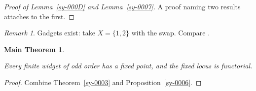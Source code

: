 \documentclass{amsart}
\providecommand{\uses}[1]{}
\theoremstyle{plain}
\newtheorem*{mainthm}{Main Theorem}
\theoremstyle{definition}
\theoremstyle{remark}
\newtheorem{remark}[theorem]{Remark}
\begin{document}

\begin{proof}[Proof of Lemma~\ref{sy-000D} and Lemma~\ref{sy-0007}]
A proof naming two results attaches to the first.
\end{proof}

\begin{remark}\label{sy-000A}
Gadgets exist: take $X = \{1,2\}$ with the swap. Compare \cite[Theorem 2.1]{Kre99}.
\end{remark}


\begin{mainthm}\label{sy-000B}
\uses{sy-0003, sy-0006}
Every finite widget of odd order has a fixed point, and the fixed locus is functorial.
\end{mainthm}
\begin{proof}
Combine Theorem~\ref{sy-0003} and Proposition~\ref{sy-0006}.
\end{proof}




\end{document}
